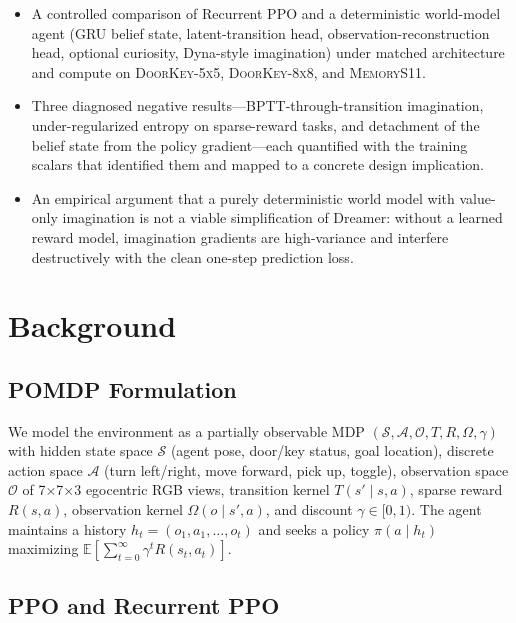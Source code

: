 \documentclass[letterpaper]{article}
\begin{document}
\begin{itemize}
    \item A controlled comparison of Recurrent PPO and a deterministic
    world-model agent (GRU belief state, latent-transition head,
    observation-reconstruction head, optional curiosity, Dyna-style
    imagination) under matched architecture and compute on
    \textsc{DoorKey-5x5}, \textsc{DoorKey-8x8}, and \textsc{MemoryS11}.
    \item Three diagnosed negative results---BPTT-through-transition
    imagination, under-regularized entropy on sparse-reward tasks, and
    detachment of the belief state from the policy gradient---each
    quantified with the training scalars that identified them and mapped to
    a concrete design implication.
    \item An empirical argument that a purely deterministic world model with
    value-only imagination is not a viable simplification of Dreamer: without
    a learned reward model, imagination gradients are high-variance and
    interfere destructively with the clean one-step prediction loss.
\end{itemize}

\section{Background}

\subsection{POMDP Formulation}

We model the environment as a partially observable MDP
$(\mathcal{S}, \mathcal{A}, \mathcal{O}, T, R, \Omega, \gamma)$ with hidden
state space $\mathcal{S}$ (agent pose, door/key status, goal location),
discrete action space $\mathcal{A}$ (turn left/right, move forward, pick up,
toggle), observation space $\mathcal{O}$ of 7$\times$7$\times$3 egocentric
RGB views, transition kernel $T(s' \mid s, a)$, sparse reward $R(s,a)$,
observation kernel $\Omega(o \mid s', a)$, and discount $\gamma \in [0,1)$.
The agent maintains a history $h_t = (o_1, a_1, \ldots, o_t)$ and seeks
a policy $\pi(a \mid h_t)$ maximizing
$\mathbb{E}\left[\sum_{t=0}^{\infty} \gamma^t R(s_t, a_t)\right]$.

\subsection{PPO and Recurrent PPO}
\end{document}
